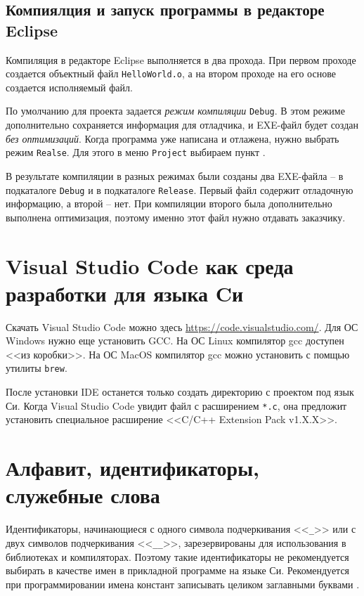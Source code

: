 \documentclass[%
	11pt,
	a4paper,
	utf8,
		]{article}
\begin{document}
\subsection{Компиялция и запуск программы в редакторе Eclipse}

Компиляция в редакторе Eclipse выполняется в два прохода. При первом проходе создается объектный файл \verb|HelloWorld.o|, а на втором проходе на его основе создается исполняемый файл.

По умолчанию для проекта задается \emph{режим компиляции} \verb|Debug|. В этом режиме дополнительно сохраняется информация для отладчика, и EXE-файл будет создан \emph{без оптимизаций}. Когда программа уже написана и отлажена, нужно выбрать режим \verb|Realse|. Для этого в меню \verb|Project| выбираем пункт .

В результате компиляции в разных режимах были созданы два EXE-файла -- в подкаталоге \verb|Debug| и в подкаталоге \verb|Release|. Первый файл содержит отладочную информацию, а второй -- нет. При компиляции второго была дополнительно выполнена оптимизация, поэтому именно этот файл нужно отдавать заказчику.






\section{Visual Studio Code как среда разработки для языка Cи}

Скачать Visual Studio Code можно здесь \url{https://code.visualstudio.com/}. Для ОС Windows нужно еще установить GCC. На ОС Linux компилятор gcc доступен <<из коробки>>. На ОС MacOS компилятор gcc можно установить с помщью утилиты \verb|brew|.

После установки IDE останется только создать директорию с проектом под язык Си. Когда Visual Studio Code увидит файл с расширением \verb|*.c|, она предложит установить специальное расширение <<C/C++ Extension Pack v1.X.X>>.

\section{Алфавит, идентификаторы, служебные слова}

Идентификаторы, начинающиеся с одного символа подчеркивания <<\verb|_|>> или с двух символов подчеркивания <<\verb*|__|>>, зарезервированы для использования в библиотеках и компиляторах. Поэтому такие идентификаторы не рекомендуется выбирать в качестве имен в прикладной программе на языке Си. Рекомендуется при программировании имена констант записывать целиком заглавными буквами \cite[]{podbelskiy-prog-c:2005}.
\end{document}
